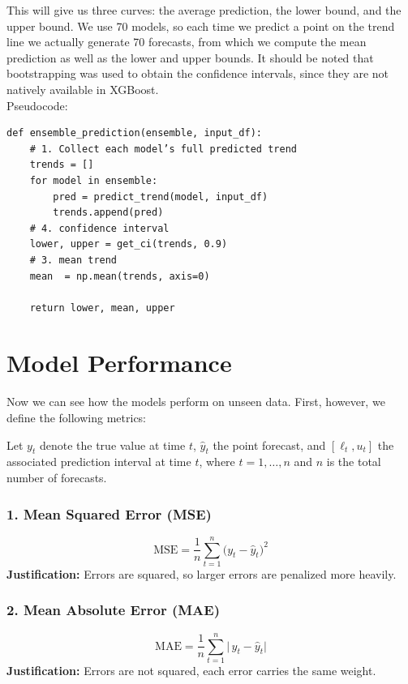 \documentclass{Configuration_Files/PoliMi3i_thesis}
\begin{document}
This will give us three curves: the average prediction, the lower bound, and the upper bound. We use 70 models, so each time we predict a point on the trend line we actually generate 70 forecasts, from which we compute the mean prediction as well as the lower and upper bounds.
It should be noted that bootstrapping was used to obtain the confidence intervals, since they are not natively available in XGBoost.
\\Pseudocode:
\begin{verbatim}
def ensemble_prediction(ensemble, input_df):
    # 1. Collect each model’s full predicted trend 
    trends = []
    for model in ensemble:
        pred = predict_trend(model, input_df)
        trends.append(pred)
    # 4. confidence interval
    lower, upper = get_ci(trends, 0.9)
    # 3. mean trend
    mean  = np.mean(trends, axis=0)

    return lower, mean, upper
\end{verbatim}


\chapter{Model Performance}

Now we can see how the models perform on unseen data. First, however, we define the following metrics:

Let \(y_{t}\) denote the true value at time \(t\), \(\hat y_{t}\) the point forecast, and \([\ell_{t}, u_{t}]\) the associated prediction interval at time \(t\), where \(t = 1, \dots, n\) and \(n\) is the total number of forecasts.



\subsection*{1. Mean Squared Error (MSE)}
\[
\mathrm{MSE}
= \frac{1}{n} \sum_{t=1}^{n} \bigl(y_{t} - \hat y_{t}\bigr)^{2}
\]
\textbf{Justification:} Errors are squared, so larger errors are penalized more heavily.

\subsection*{2. Mean Absolute Error (MAE)}
\[
\mathrm{MAE}
= \frac{1}{n} \sum_{t=1}^{n} \bigl|\,y_{t} - \hat y_{t}\bigr|
\]
\textbf{Justification:} Errors are not squared, each error carries the same weight.
\end{document}

